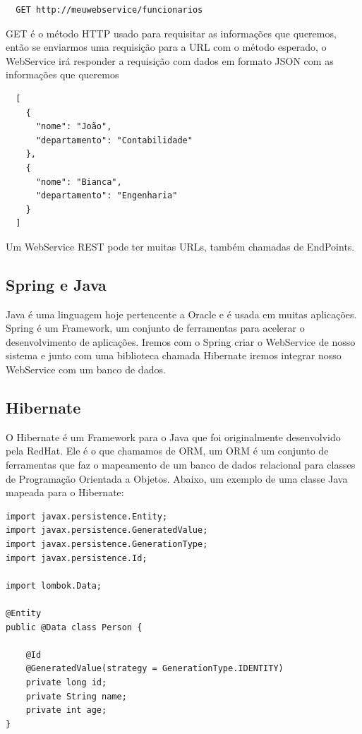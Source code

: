 \documentclass[12pt]{article}
\begin{document}
\begin{verbatim}
  GET http://meuwebservice/funcionarios
\end{verbatim}

GET é o método HTTP usado para requisitar as informações que queremos, então se enviarmos uma requisição
para a URL com o método esperado, o WebService irá responder a requisição com dados em formato JSON com as informações que queremos

\begin{verbatim}
  [
    {
      "nome": "João",
      "departamento": "Contabilidade"
    },
    {
      "nome": "Bianca",
      "departamento": "Engenharia"
    }
  ]
\end{verbatim}

Um WebService REST pode ter muitas URLs, também chamadas de EndPoints.

\subsection{Spring e Java}

Java é uma linguagem hoje pertencente a Oracle e é usada em muitas aplicações.
Spring é um Framework, um conjunto de ferramentas para acelerar o desenvolvimento de aplicações.
Iremos com o Spring criar o WebService de nosso sistema e junto com uma biblioteca chamada Hibernate
iremos integrar nosso WebService com um banco de dados.

\subsection{Hibernate}

O Hibernate é um Framework para o Java que foi originalmente desenvolvido pela RedHat.
Ele é o que chamamos de ORM, um ORM é um conjunto de ferramentas que faz o mapeamento
de um banco de dados relacional para classes de Programação Orientada a Objetos.
Abaixo, um exemplo de uma classe Java mapeada para o Hibernate:

\begin{verbatim}
import javax.persistence.Entity;
import javax.persistence.GeneratedValue;
import javax.persistence.GenerationType;
import javax.persistence.Id;

import lombok.Data;

@Entity
public @Data class Person {

    @Id
    @GeneratedValue(strategy = GenerationType.IDENTITY)
    private long id;
    private String name;
    private int age;
}
\end{verbatim}
\end{document}
